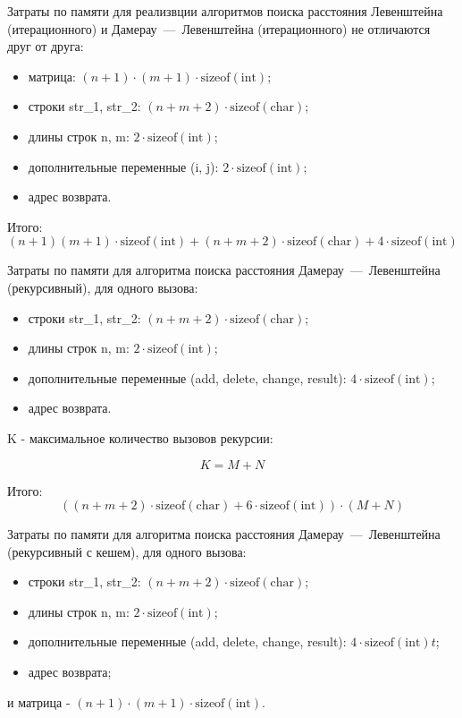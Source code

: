 Затраты по памяти для реализвции алгоритмов поиска расстояния Левенштейна (итерационного) и Дамерау~---~Левенштейна (итерационного) не отличаются друг от друга:
\begin{itemize}
	\item матрица: $(n + 1) \cdot (m + 1) \cdot \text{sizeof}(\text{int})$;
	\item строки str\_1, str\_2: $(n + m + 2) \cdot \text{sizeof}(\text{char})$;
	\item длины строк n, m: $2\cdot \text{sizeof}(\text{int})$;
	\item дополнительные переменные (i, j): $2\cdot \text{sizeof}(\text{int})$;
	\item адрес возврата.
\end{itemize}

Итого:
\begin{equation}
	\label{eq:memLev}
	(n + 1)(m + 1) \cdot \text{sizeof}(\text{int}) + (n + m + 2) \cdot \text{sizeof}(\text{char}) + 4 \cdot \text{sizeof}(\text{int})
\end{equation}

Затраты по памяти для алгоритма поиска расстояния Дамерау~---~Левенштейна (рекурсивный), для одного вызова:
\begin{itemize}
	\item строки str\_1, str\_2: $(n + m + 2) \cdot \text{sizeof}(\text{char})$;
	\item длины строк n, m: $2 \cdot \text{sizeof}(\text{int})$;
	\item дополнительные переменные (add, delete, change, result): $4 \cdot \text{sizeof}(\text{int})$;
	\item адрес возврата.
\end{itemize}

K - максимальное количество вызовов рекурсии:

\begin{equation}
 K = M + N
\end{equation}

Итого:
\begin{equation}
	\label{eq:memrecLev}
	((n + m + 2) \cdot \text{sizeof}(\text{char}) + 6 \cdot \text{sizeof}(\text{int})) \cdot (M + N)
\end{equation}


Затраты по памяти для алгоритма поиска расстояния Дамерау~---~Левенштейна (рекурсивный с кешем), для одного вызова:
\begin{itemize}
	\item строки str\_1, str\_2: $(n + m + 2) \cdot \text{sizeof}(\text{char})$;
	\item длины строк n, m: $2 \cdot \text{sizeof}(\text{int})$;
	\item дополнительные переменные (add, delete, change, result): $4 \cdot \text{sizeof}(\text{int})t$;
	\item адрес возврата;
\end{itemize}
   и матрица - $(n + 1) \cdot (m + 1) \cdot \text{sizeof}(\text{int})$.\newline

